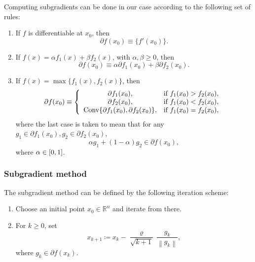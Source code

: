 \documentclass[final]{aomart}
\newcommand{\Rn}{\mathbb{R}^n}
\newcommand{\xk}{x_k}
\newtheorem[{}\it]{thm}{Theorem}[section]
\theoremstyle{definition}
\newtheorem*[{}\it]{notation}{Notation}
\numberwithin{equation}{section}
\renewcommand{\rho}{\varrho}
\newcommand{\interval}[1]{\mathinner{#1}}
\newcommand{\enVert}[1]{\left\lVert#1\right\rVert}
\let\norm=\enVert
\begin{document}
Computing subgradients can be done in our case according to the following set of rules:
\begin{enumerate}
	\item If \(f\) is differentiable at \(x_0\), then
	\begin{equation}
	\partial f(x_0) \equiv \{f'(x_0)\}.
	\end{equation}
	\item If \(f(x) = \alpha f_1(x) + \beta f_2(x)\), with \(\alpha, \beta \geqslant 0\), then
	\begin{equation}
	\partial f(x_0) \equiv \alpha \partial f_1(x_0) + \beta \partial f_2(x_0).
	\end{equation}
	\item If \(f(x) = \max\{f_1(x), f_2(x)\}\), then
	\begin{equation}
	\partial f(x_0) \equiv \left\{
	\begin{array}{cl}
	\partial f_1(x_0), & \textnormal{if } f_1(x_0) > f_2(x_0),\\
	\partial f_2(x_0), & \textnormal{if } f_1(x_0) < f_2(x_0),\\
	\mathop{\mathrm{Conv}}\{\partial f_1(x_0), \partial f_2(x_0)\}, & \textnormal{if } f_1(x_0) = f_2(x_0),
	\end{array}
	\right.
	\end{equation}
	where the last case is taken to mean that for any \(g_1 \in \partial f_1(x_0), g_2 \in \partial f_2(x_0)\),
	\begin{equation}
	\alpha g_1 + (1 - \alpha) g_2 \in \partial f(x_0),
	\end{equation}
	where \(\alpha \in \interval{[0, 1]}\).
\end{enumerate}

\subsubsection{Subgradient method}
\label{sec:subgradient_method}
The subgradient method can be defined by the following iteration scheme:
\begin{enumerate}
	\item Choose an initial point \(x_0 \in \Rn\) and iterate from there.
	\item For \(k \geqslant 0\), set
	\begin{equation}
	x_{k+1} \coloneqq \xk - \frac{\rho}{\sqrt{k+1}}\, \frac{g_k}{\norm{g_k}},
	\end{equation}
	where \(g_k \in \partial f(\xk)\).
\end{enumerate}
\end{document}
